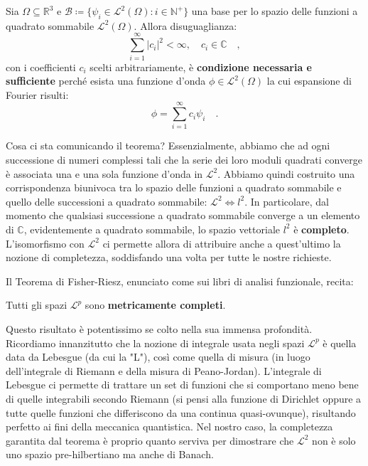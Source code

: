 \begin{teorema}
    Sia $\Omega \subseteq \mathbb{R}^3$ e $\mathcal{B} \coloneq \{ \psi_i \in \mathcal{L}^2(\Omega) : i \in \mathbb{N}^+ \}$ una base per lo spazio delle funzioni a quadrato sommabile $\mathcal{L}^2(\Omega)$. Allora disuguaglianza:
    \[
        \sum_{i = 1}^\infty |c_i|^2 < \infty, \quad c_i \in \mathbb{C} \quad,
    \]
    con i coefficienti $c_i$ scelti arbitrariamente, è \textbf{condizione necessaria e sufficiente} perché esista una funzione d'onda $\phi \in \mathcal{L}^2(\Omega)$ la cui espansione di Fourier risulti:  
    \[
        \phi = \sum_{i= 1}^\infty c_i \psi_i \quad.
    \]
\end{teorema}
Cosa ci sta comunicando il teorema? Essenzialmente, abbiamo che ad ogni successione di numeri complessi tali che la serie dei loro moduli quadrati converge è associata una e una sola funzione d'onda in $\mathcal{L}^2$. Abbiamo quindi costruito una corrispondenza biunivoca tra lo spazio delle funzioni a quadrato sommabile e quello delle successioni a quadrato sommabile: $\mathcal{L}^2 \iff l^2$. In particolare, dal momento che qualsiasi successione a quadrato sommabile converge a un elemento di $\mathbb{C}$, evidentemente a quadrato sommabile, lo spazio vettoriale $l^2$ è \textbf{completo}. L'isomorfismo con $\mathcal{L}^2$ ci permette allora di attribuire anche a quest'ultimo la nozione di completezza, soddisfando una volta per tutte le nostre richieste.

\begin{approfondimento}[title={Il vero Teorema di Fisher-Riesz}]
    \noindent
    Il Teorema di Fisher-Riesz, enunciato come sui libri di analisi funzionale, recita:
    \begin{teorema}
        Tutti gli spazi $\mathcal{L}^p$ sono \textbf{metricamente completi}.
    \end{teorema}
    Questo risultato è potentissimo se colto nella sua immensa profondità. Ricordiamo innanzitutto che la nozione di integrale usata negli spazi $\mathcal{L}^p$ è quella data da Lebesgue (da cui la "L"), così come quella di misura (in luogo dell'integrale di Riemann e della misura di Peano-Jordan). L'integrale di Lebesgue ci permette di trattare un set di funzioni che si comportano meno bene di quelle integrabili secondo Riemann (si pensi alla funzione di Dirichlet oppure a tutte quelle funzioni che differiscono da una continua quasi-ovunque), risultando perfetto ai fini della meccanica quantistica. Nel nostro caso, la completezza garantita dal teorema è proprio quanto serviva per dimostrare che $\mathcal{L}^2$ non è solo uno spazio pre-hilbertiano ma anche di Banach. 
\end{approfondimento}

